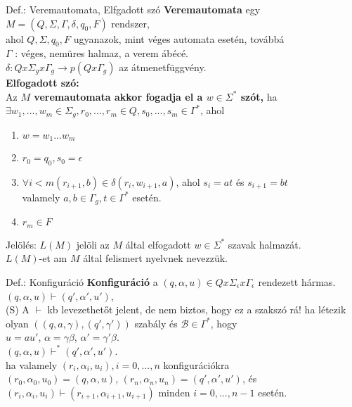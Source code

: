 \documentclass{beamer}
\begin{document}
\begin{frame}
\begin{block}{Def.: Veremautomata, Elfgadott szó}
\textbf{Veremautomata} egy $M = (Q, {\Sigma}, {\Gamma}, {\delta}, q_0, F)$ rendszer,\\
ahol $Q, {\Sigma}, q_0, F$ ugyanazok, mint véges automata esetén, továbbá\\
\medskip
$\Gamma$ : véges, nemüres halmaz, a verem ábécé.\\
$\delta : Q x {\Sigma}_g x {\Gamma}_g \rightarrow p(Q x {\Gamma}_g)$ az átmenetfüggvény.\\
\bigskip
\textbf{Elfogadott szó:}\\
Az \textbf{$M$ veremautomata akkor fogadja el a $w \in {\Sigma}^*$ szót,} ha\\
${\exists}w_1, ..., w_m \in {\Sigma}_g, r_0, ..., r_m \in Q, s_0, ..., s_m \in {\Gamma}^*$, ahol\\
\begin{enumerate}
\item $w = w_1...w_m$\\
\item $r_0 = q_0, s_0 = \epsilon$
\item ${\forall}i < m (r_{i + 1}, b) \in {\delta}(r_i, w_{i + 1}, a)$, ahol $s_i = at$ és $s_{i + 1} = bt$\\
valamely $a, b \in {\Gamma}_g, t \in {\Gamma}^*$ esetén.
\item $r_m \in F$
\end{enumerate}
\medskip
Jelölés: $L(M)$ jelöli az $M$ által elfogadott $w \in {\Sigma}^*$ szavak halmazát.\\
$L(M)$-et am $M$ által felismert nyelvnek nevezzük.
\end{block}
\end{frame}

\begin{frame}
\begin{block}{Def.: Konfiguráció}
\textbf{Konfiguráció} a $(q, {\alpha}, u) \in Q x {\Sigma}_{\epsilon} x {\Gamma}_{\epsilon}$ rendezett hármas.\\
\medskip
$(q, {\alpha}, u) \vdash (q', {\alpha}', u')$,\\
{\tiny (S) A $\vdash$ kb levezethetőt jelent, de nem biztos, hogy ez a szakszó rá!}
\medskip
ha létezik olyan $((q, a, {\gamma}), (q', {\gamma}'))$ szabály és $\mathcal{B} \in {\Gamma}^*$, hogy\\
\medskip
$u = au'$, $\alpha = {\gamma}{\beta}$, ${\alpha}' = {\gamma}'{\beta}$.\\
\medskip
$(q, {\alpha}, u) {\vdash}^* (q', {\alpha}', u')$.\\
\medskip
ha valamely $(r_i, {\alpha}_i, u_i), i = 0, ..., n$ konfigurációkra\\
\medskip
$(r_0, {\alpha}_0, u_0) = (q, {\alpha}, u)$, $(r_n, {\alpha}_n, u_n) = (q', {\alpha}', u')$, és\\
$(r_i, {\alpha}_i, u_i) \vdash (r_{i + 1}, {\alpha}_{i + 1}, u_{i + 1})$ minden $i = 0, ..., n - 1$ esetén.\\
\end{block}
\end{frame}
\end{document}
